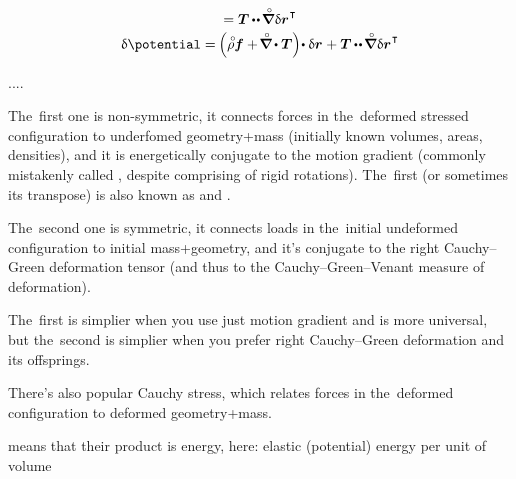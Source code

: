 \begin{equation*}
\begin{array}{c}
= \firstpiolakirchhoffstress \hspace{-0.1ex} \dotdotp \hspace{-0.2ex} \boldnablacircled \hspace{.1ex} \variation{\currentlocationvector}^{\hspace{0.12ex}\T}
\\[.25em]
%
\variation{\potential}
= \hspace{-0.16ex} \left(^{\mathstrut} \hspace{-0.1ex} \mathcircabove{\rho} \bm{f} + \hspace{-0.25ex} \boldnablacircled \hspace{-0.1ex} \dotp \firstpiolakirchhoffstress \right) \hspace{-0.4ex} \dotp \variation{\currentlocationvector}
\hspace{.1ex}
+ \firstpiolakirchhoffstress \hspace{-0.1ex} \dotdotp \hspace{-0.2ex} \boldnablacircled \hspace{.1ex} \variation{\currentlocationvector}^{\hspace{0.12ex}\T}
\end{array}
\end{equation*}



....

The~first one is non-symmetric, it connects forces in the~deformed stressed configuration to underfomed geometry+mass (initially known volumes, areas, densities), and it is energetically conjugate to the motion gradient (commonly mistakenly called , despite comprising of rigid rotations). The~first (or sometimes its transpose) is also known as  and .

The~second one is symmetric, it connects loads in the~initial undeformed configuration to initial mass+geometry, and it’s conjugate to the right Cauchy\hbox{--}Green deformation tensor (and thus to the Cauchy\hbox{--}Green\hbox{--}Venant measure of deformation).

The~first is simplier when you use just motion gradient and is more universal, but the~second is simplier when you prefer right Cauchy\hbox{--}Green deformation and its offsprings.

There’s also popular Cauchy stress, which relates forces in the~deformed configuration to deformed geometry+mass.

 means that their product is energy, here: elastic (potential) energy per unit of volume

